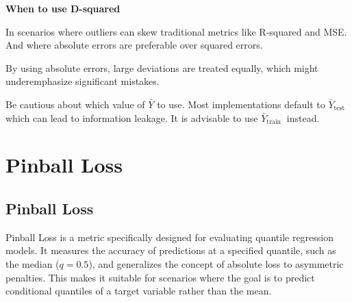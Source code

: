 \textbf{When to use D-squared}

In scenarios where outliers can skew traditional metrics like R-squared and MSE. And where absolute errors are preferable over squared errors.

{
    \item By using absolute errors, large deviations are treated equally, which might underemphasize significant mistakes.
    \item Be cautious about which value of $\bar{Y}$ to use. Most implementations default to $\bar{Y}_{\text {test }}$ which can lead to information leakage. It is advisable to use $\bar{Y}_{\text {train }}$ instead.
}


\clearpage
\thispagestyle{regressionstyle}
\section{Pinball Loss}
\subsection{Pinball Loss }

Pinball Loss is a metric specifically designed for evaluating quantile regression models. It measures the accuracy of predictions at a specified quantile, such as the median ($q=0.5$),
and generalizes the concept of absolute loss to asymmetric penalties. This makes it suitable for scenarios where the goal is to predict conditional quantiles of a target variable
rather than the mean.

\begin{center}
\end{center}

